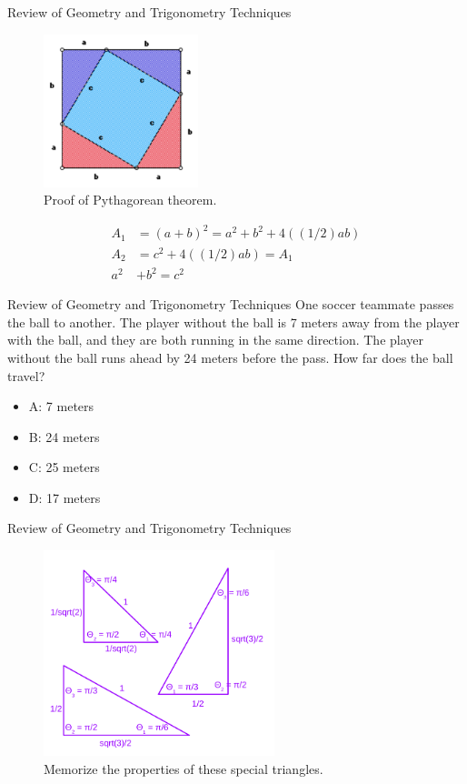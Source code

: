 \documentclass{beamer}
\begin{document}
\begin{frame}{Review of Geometry and Trigonometry Techniques}
\small
\begin{figure}
\centering
\includegraphics[width=0.4\textwidth]{figures/pyth.png}
\caption{\label{fig:pyth} Proof of Pythagorean theorem.}
\end{figure}
\begin{align}
A_1 &= (a+b)^2 = a^2 + b^2 + 4((1/2) a b) \\
A_2 &= c^2 + 4((1/2)ab) = A_1 \\
a^2 &+ b^2 = c^2
\end{align}
\end{frame}

\begin{frame}{Review of Geometry and Trigonometry Techniques}
One soccer teammate passes the ball to another.  The player without the ball is 7 meters away from the player with the ball, and they are both running in the same direction.  The player without the ball runs ahead by 24 meters before the pass.  How far does the ball travel? \\
\begin{itemize}
\item A: 7 meters
\item B: 24 meters
\item C: 25 meters
\item D: 17 meters
\end{itemize}
\end{frame}

\begin{frame}{Review of Geometry and Trigonometry Techniques}
\small
\begin{figure}
\centering
\includegraphics[width=0.6\textwidth]{figures/triangles.pdf}
\caption{\label{fig:triangles} \alert{Memorize} the properties of these special triangles.}
\end{figure}
\end{frame}
\end{document}
